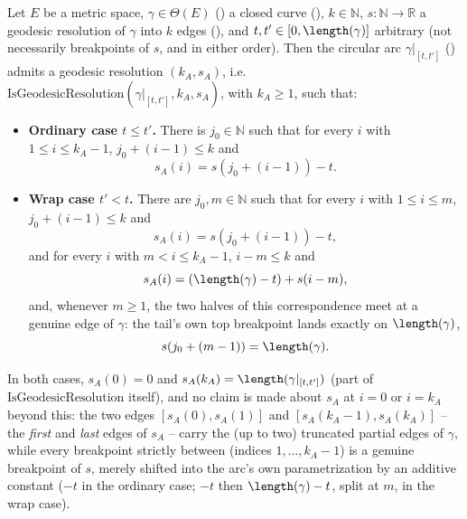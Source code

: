 \begin{lemma}
  Let $E$ be a metric space, $\gamma \in \Theta(E)$ () a closed curve
  (), $k \in \mathbb{N}$, $s \colon \mathbb{N} \to \mathbb{R}$ a geodesic
  resolution of $\gamma$ into $k$ edges (), and $t,t' \in
  [0,\length(\gamma)]$ arbitrary (not necessarily breakpoints of $s$, and in either order). Then the
  circular arc $\gamma|_{[t,t']}$ () admits a geodesic resolution
  $(k_A,s_A)$, i.e.\ $\mathrm{IsGeodesicResolution}(\gamma|_{[t,t']},k_A,s_A)$, with $k_A \ge 1$, such
  that:
  \begin{itemize}
    \item \textbf{Ordinary case $t \le t'$.} There is $j_0 \in \mathbb{N}$ such that for every $i$
      with $1 \le i \le k_A-1$, $j_0+(i-1) \le k$ and
      \[
        s_A(i) = s(j_0+(i-1)) - t
        .
      \]
    \item \textbf{Wrap case $t' < t$.} There are $j_0,m \in \mathbb{N}$ such that for every $i$ with
      $1 \le i \le m$, $j_0+(i-1) \le k$ and
      \[
        s_A(i) = s(j_0+(i-1)) - t
        ,
      \]
      and for every $i$ with $m < i \le k_A - 1$, $i-m \le k$ and
      \[
        s_A(i) = (\length(\gamma)-t) + s(i-m)
        ,
      \]
      and, whenever $m \ge 1$, the two halves of this correspondence meet at a genuine edge of
      $\gamma$: the tail's own top breakpoint lands exactly on $\length(\gamma)$,
      \[
        s(j_0+(m-1)) = \length(\gamma)
        .
      \]
  \end{itemize}
  In both cases, $s_A(0)=0$ and $s_A(k_A) = \length(\gamma|_{[t,t']})$ (part of
  $\mathrm{IsGeodesicResolution}$ itself), and no claim is made about $s_A$ at $i=0$ or $i=k_A$
  beyond this: the two edges $[s_A(0),s_A(1)]$ and $[s_A(k_A-1),s_A(k_A)]$ -- the \emph{first} and
  \emph{last} edges of $s_A$ -- carry the (up to two) truncated partial edges of $\gamma$, while
  every breakpoint strictly between (indices $1,\dots,k_A-1$) is a genuine breakpoint of $s$,
  merely shifted into the arc's own parametrization by an additive constant ($-t$ in the ordinary
  case; $-t$ then $\length(\gamma)-t$, split at $m$, in the wrap case).


\end{lemma}
